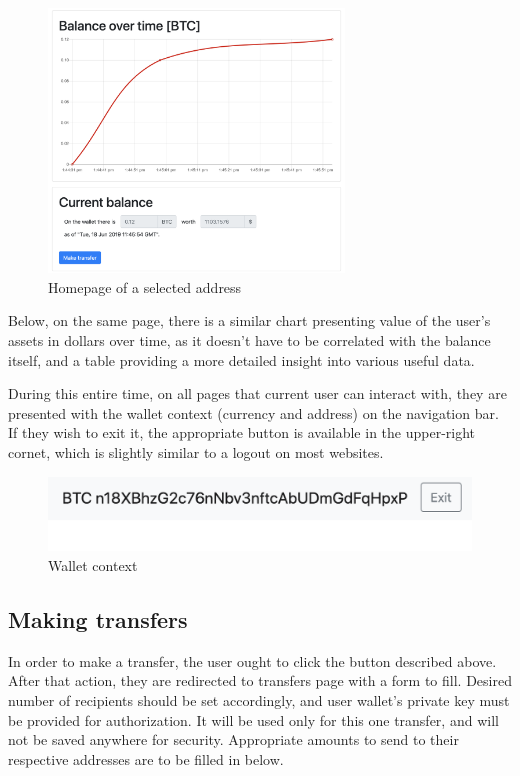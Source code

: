 \begin{figure}[ht]
    \centering
    \includegraphics[width=0.7\textwidth]{assets/homepage.png}
    \caption{Homepage of a selected address}
    \label{5:fig:homepage}
\end{figure}

Below, on the same page, there is a similar chart
presenting value of the user's assets in dollars over time,
as it doesn't have to be correlated with the balance itself,
and a table providing a more detailed insight into various useful data.

During this entire time,
on all pages that current user can interact with,
they are presented with the wallet context (currency and address)
on the navigation bar.
If they wish to exit it,
the appropriate button is available in the upper-right cornet,
which is slightly similar to a logout on most websites.

\begin{figure}[ht]
    \centering
    \includegraphics[width=\textwidth]{assets/logout.png}
    \caption{Wallet context}
    \label{5:fig:logout}
\end{figure}

\subsection{Making transfers}

In order to make a transfer,
the user ought to click the button described above.
After that action, they are redirected to transfers page
with a form to fill.
Desired number of recipients should be set accordingly,
and user wallet's private key must be provided for authorization.
It will be used only for this one transfer,
and will not be saved anywhere for security.
Appropriate amounts to send to their respective addresses
are to be filled in below.

